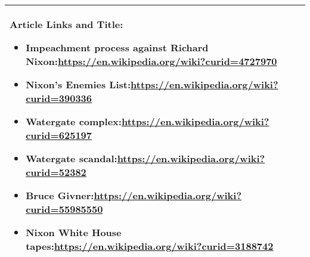 \begin{table}[h]
\begin{tabular}{ Y }
    Article Links and Title: \begin{itemize}
        \itemsep0em 
        \item Impeachment process against Richard Nixon:\url{https://en.wikipedia.org/wiki?curid=4727970}
        \item Nixon's Enemies List:\url{https://en.wikipedia.org/wiki?curid=390336}
        \item Watergate complex:\url{https://en.wikipedia.org/wiki?curid=625197}
        \item Watergate scandal:\url{https://en.wikipedia.org/wiki?curid=52382}
        \item Bruce Givner:\url{https://en.wikipedia.org/wiki?curid=55985550}
        \item Nixon White House tapes:\url{https://en.wikipedia.org/wiki?curid=3188742}
    \end{itemize}\Tstrut\Bstrut\\\hline
    \end{tabular}
\end{table}

